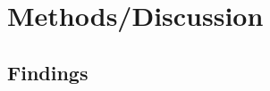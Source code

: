 \documentclass[xcolor=x11names,compress]{beamer}
\begin{document}
\section{Methods/Discussion}
\subsection*{Findings}
% 
% 
% 
% 
\end{document}
